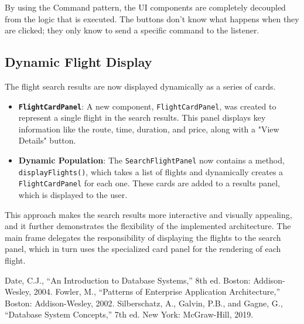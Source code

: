 \documentclass[conference]{IEEEtran}
\begin{document}
    By using the Command pattern, the UI components are completely decoupled from the logic that is executed. The buttons don't know what happens when they are clicked; they only know to send a specific command to the listener.

    \subsection{Dynamic Flight Display}
    The flight search results are now displayed dynamically as a series of cards.

    \begin{itemize}
        \item \textbf{\texttt{FlightCardPanel}}: A new component, \texttt{FlightCardPanel}, was created to represent a single flight in the search results. This panel displays key information like the route, time, duration, and price, along with a "View Details" button.

        \item \textbf{Dynamic Population}: The \texttt{SearchFlightPanel} now contains a method, \texttt{displayFlights()}, which takes a list of flights and dynamically creates a \texttt{FlightCardPanel} for each one. These cards are added to a results panel, which is displayed to the user.
    \end{itemize}

    This approach makes the search results more interactive and visually appealing, and it further demonstrates the flexibility of the implemented architecture. The main frame delegates the responsibility of displaying the flights to the search panel, which in turn uses the specialized card panel for the rendering of each flight.


    \begin{thebibliography}{00}
         Date, C.J., ``An Introduction to Database Systems,'' 8th ed. Boston: Addison-Wesley, 2004.
         Fowler, M., ``Patterns of Enterprise Application Architecture,'' Boston: Addison-Wesley, 2002.
         Silberschatz, A., Galvin, P.B., and Gagne, G., ``Database System Concepts,'' 7th ed. New York: McGraw-Hill, 2019.
    \end{thebibliography}
\end{document}
